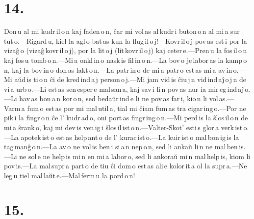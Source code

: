 \documentclass[ngerman,12pt,twoside]{book}
\begin{document}
\section*{14.}

Don\,u al mi kudr\,il\,o\,n kaj faden\,o\,n, ĉar mi vol\,as al\,kudr\,i buton\,o\,n al mi\,a sur\,tut\,o.---Rigard\,u, kiel la agl\,o bat\,as kun la flug\,il\,o\,j!---Kovr\,il\,o\,j pov\,as est\,i por la vizaĝ\,o (vizaĝ\,kovr\,il\,o\,j), por la lit\,o\,j (lit\,kovr\,il\,o\,j) kaj ceter\,e.---Pren\,u la fos\,il\,o\,n kaj fos\,u tomb\,o\,n.---Mi\,a onkl\,in\,o nask\,is fil\,in\,o\,n.---La bov\,o je\,labor\,as la kamp\,o\,n, kaj la bov\,in\,o don\,as lakt\,o\,n.---La patr\,in\,o de mi\,a patr\,o est\,as mi\,a av\,in\,o.---Mi aŭd\,is ti\,o\,n ĉi de kred\,ind\,a\,j person\,o\,j.---Mi jam vid\,is ĉiu\,j\,n vid\,ind\,aĵ\,o\,j\,n de vi\,a urb\,o.---Li est\,as sen\,esper\,e mal\,san\,a, kaj sav\,i li\,n pov\,as nur ia mir\,eg\,ind\,aĵ\,o.---Li hav\,as bon\,a\,n kor\,o\,n, sed bedaŭr\,ind\,e li ne pov\,as far\,i, kio\,n li vol\,as.---Varm\,a fum\,o est\,as por mi mal\,util\,a, tial mi ĉiam fum\,as tra cigar\,ing\,o.---Por ne pik\,i la fingr\,o\,n ĉe l' kudr\,ad\,o, oni port\,as fingr\,ing\,o\,n.---Mi perd\,is la ŝlos\,il\,o\,n de mi\,a ŝrank\,o, kaj mi dev\,is ven\,ig\,i ŝlos\,il\,ist\,o\,n.---Valter-Skot' esti\,s glor\,a verk\,ist\,o.---La apotek\,ist\,o est\,as help\,ant\,o de l' kurac\,ist\,o.---La kuir\,ist\,o mal\,bon\,ig\,is la tag\,manĝ\,o\,n.---La av\,o ne vol\,is ben\,i si\,a\,n nep\,o\,n, sed li ankaŭ li\,n ne mal\,ben\,is.---Li ne sol\,e ne help\,is mi\,n en mi\,a labor\,o, sed li ankoraŭ mi\,n mal\,help\,is, kiom li pov\,is.---La mal\,supr\,a part\,o de tiu ĉi dom\,o est\,as ali\,e kolor\,it\,a ol la supr\,a.---Ne leg\,u tiel mal\,laŭt\,e.---Mal\,ferm\,u la pord\,o\,n! 

\section*{15.}
\end{document}
